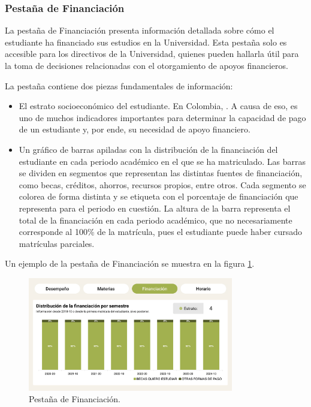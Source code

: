 \subsubsection{Pestaña de Financiación}

La pestaña de Financiación presenta información detallada sobre cómo el estudiante ha financiado sus estudios en la Universidad. Esta pestaña solo es accesible para los directivos de la Universidad, quienes pueden hallarla útil para la toma de decisiones relacionadas con el otorgamiento de apoyos financieros.

La pestaña contiene dos piezas fundamentales de información:
\begin{itemize}
	\item El estrato socioeconómico del estudiante. En Colombia,  \cite{estrato}. A causa de eso, es uno de muchos indicadores importantes para determinar la capacidad de pago de un estudiante y, por ende, su necesidad de apoyo financiero.
	\item Un gráfico de barras apiladas con la distribución de la financiación del estudiante en cada periodo académico en el que se ha matriculado. Las barras se dividen en segmentos que representan las distintas fuentes de financiación, como becas, créditos, ahorros, recursos propios, entre otros. Cada segmento se colorea de forma distinta y se etiqueta con el porcentaje de financiación que representa para el periodo en cuestión. La altura de la barra representa el total de la financiación en cada periodo académico, que no necesariamente corresponde al 100\% de la matrícula, pues el estudiante puede haber cursado matrículas parciales.
\end{itemize}
Un ejemplo de la pestaña de Financiación se muestra en la figura \ref{fig:financiacion}.

\begin{figure}[H]
	\centering
	\includegraphics[width=0.8\textwidth]{assets/nes/financiacion.png}
	\caption{Pestaña de Financiación.}
	\label{fig:financiacion}
\end{figure}

